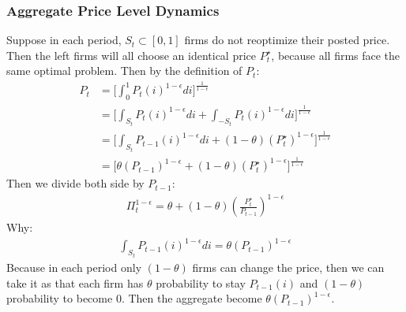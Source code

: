 \documentclass{article}
\numberwithin{equation}{section}
\begin{document}
\subsubsection{Aggregate Price Level Dynamics}
Suppose in each period, $S_t \subset [0, 1]$ firms do not reoptimize their posted price. Then the left firms will all choose an identical price $P^\star_t$, because all firms face the same optimal problem. Then by the definition of $P_t$:
	\begin{align*}
		P_t &= \bigg[\int^1_0 P_t(i)^{1-\epsilon}di\bigg]^{\frac{1}{1-\epsilon}}\\
		&= \bigg[\int_{S_t} P_t(i)^{1-\epsilon}di + \int_{-S_t} P_t(i)^{1-\epsilon}di\bigg]^{\frac{1}{1-\epsilon}}\\
		&= \bigg[\int_{S_t} P_{t-1}(i)^{1-\epsilon}di + (1 - \theta)(P^\star_t)^{1-\epsilon}\bigg]^{\frac{1}{1-\epsilon}}\\
		&= \bigg[\theta (P_{t-1})^{1-\epsilon} + (1 - \theta)(P^\star_t)^{1-\epsilon}\bigg]^{\frac{1}{1-\epsilon}}
	\end{align*}
Then we divide both side by $P_{t-1}$:
	\begin{align}
		\Pi^{1-\epsilon}_t = \theta + (1 - \theta)\left(\frac{P^\star_t}{P_{t-1}}\right)^{1-\epsilon} \label{app 1.2.1}
	\end{align}
Why:
	\begin{align*}
		\int_{S_t} P_{t-1}(i)^{1-\epsilon}di = \theta (P_{t-1})^{1-\epsilon}
	\end{align*}
Because in each period only $(1 - \theta)$ firms can change the price, then we can take it as that each firm has $\theta$ probability to stay $P_{t-1}(i)$ and $(1 - \theta)$ probability to become $0$. Then the aggregate become $\theta (P_{t-1})^{1-\epsilon}.$
\end{document}
